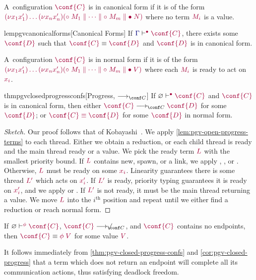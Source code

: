 \documentclass[main.tex]{subfiles}
\begin{document}
\begin{compacttheorems}
  \begin{definition}%
    \label{def:pgv-canonical-forms}
    A~configuration $\tm{\conf{C}}$ is in canonical form if it is of the form
    \(
    \tm{\res{x_1}{x'_1}{\dots\res{x_n}{x'_n}{(\child\;M_1\parallel\dots\parallel\child\;M_m\parallel\main\;N)}}}
    \)
    where no term $\tm{M_i}$ is a value.
  \end{definition}
  \begin{restatablelemma}{lempgvcanonicalforms}[Canonical Forms]%
    \label{lem:pgv-canonical-forms}
    If $\cseq[\main]{\ty{\Gamma}}{\conf{C}}$, there exists some $\tm{\conf{D}}$ such that $\tm{\conf{C}}\equiv\tm{\conf{D}}$ and $\tm{\conf{D}}$ is in canonical form.
  \end{restatablelemma}
  \begin{definition}%
    A~configuration $\tm{\conf{C}}$ is in normal form if it is of the form
    \(
    \tm{\res{x_1}{x'_1}{\dots\res{x_n}{x'_n}{(\child\;M_1\parallel\dots\parallel\child\;M_m\parallel\main\;V)}}}
    \)
    where each $\tm{M_i}$ is ready to act on $\tm{x_i}$.
  \end{definition}
  \begin{restatabletheorem}{thmpgvclosedprogressconfs}[Progress, $\cred$]%
    \label{thm:pgv-closed-progress-confs}
    If $\cseq[\main]{\emptyenv}{\conf{C}}$ and $\tm{\conf{C}}$ is in canonical form, then either $\tm{\conf{C}}\cred\tm{\conf{D}}$ for some $\tm{\conf{D}}$; or $\tm{\conf{C}\equiv\conf{D}}$ for some $\tm{\conf{D}}$ in normal form.
  \end{restatabletheorem}
  \begin{proof}[Sketch]
    Our proof follows that of Kobayashi~\cite[theorem 2]{kobayashi06}. We apply \cref{lem:pgv-open-progress-terms} to each thread. Either we obtain a reduction, or each child thread is ready and the main thread ready or a value. We pick the ready term $\tm{L}$ with the smallest priority bound. If $\tm{L}$ contains new, spawn, or a link, we apply , , or . Otherwise, $\tm{L}$ must be ready on some $\tm{x_i}$. Linearity guarantees there is some thread  $\tm{L'}$ which acts on $\tm{x'_i}$. If $\tm{L'}$ is ready, priority typing guarantees it is ready on $\tm{x'_i}$, and we apply  or . If $\tm{L'}$ is not ready, it must be the main thread returning a value. We move $\tm{L}$ into the $i^{\text{th}}$ position and repeat until we either find a reduction or reach normal form.
  \end{proof}
  \begin{corollary}%
    \label{cor:pgv-closed-progress}
    If $\cseq[\phi]{\emptyenv}{\conf{C}}$, $\tm{\conf{C}}\centernot\cred$, and $\tm{\conf{C}}$ contains no endpoints, then $\tm{\conf{C}}\equiv\tm{\phi\;V}$ for some value $\tm{V}$.
  \end{corollary}
\end{compacttheorems}
It follows immediately from \cref{thm:pgv-closed-progress-confs} and \cref{cor:pgv-closed-progress} that a term which does not return an endpoint will complete all its communication actions, thus satisfying deadlock freedom.
\end{document}

